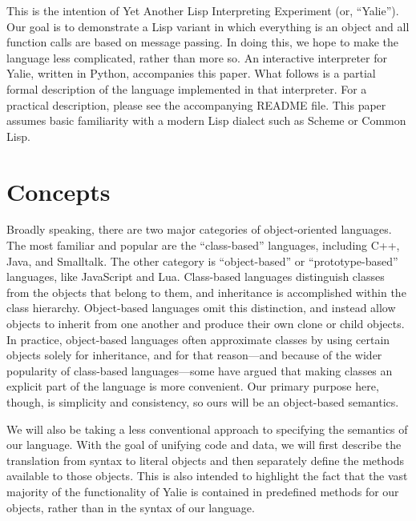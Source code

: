 \documentclass[twocolumn]{article}
\begin{document}
This is the intention of Yet Another Lisp Interpreting Experiment (or,
``Yalie''). Our goal is to demonstrate a Lisp variant in which
everything is an object and all function calls are based on message
passing. In doing this, we hope to make the language less complicated,
rather than more so. An interactive interpreter for Yalie, written in
Python, accompanies this paper. What follows is a partial formal
description of the language implemented in that interpreter.  For a
practical description, please see the accompanying README file. This
paper assumes basic familiarity with a modern Lisp dialect such as
Scheme or Common Lisp.

\section*{Concepts}
Broadly speaking, there are two major categories of object-oriented
languages.\cite{Abadi} The most familiar and popular are the
``class-based'' languages, including C++, Java, and Smalltalk. The
other category is ``object-based'' or ``prototype-based'' languages,
like JavaScript and Lua. Class-based languages distinguish classes
from the objects that belong to them, and inheritance is accomplished
within the class hierarchy. Object-based languages omit this
distinction, and instead allow objects to inherit from one another and
produce their own clone or child objects. In practice, object-based
languages often approximate classes by using certain objects solely
for inheritance, and for that reason---and because of the wider
popularity of class-based languages---some have argued that making
classes an explicit part of the language is more
convenient.\cite{Bruce} Our primary purpose here, though, is
simplicity and consistency, so ours will be an object-based semantics.

We will also be taking a less conventional approach to specifying the
semantics of our language. With the goal of unifying code and data, we
will first describe the translation from syntax to literal objects and
then separately define the methods available to those objects. This is
also intended to highlight the fact that the vast majority of the
functionality of Yalie is contained in predefined methods for our
objects, rather than in the syntax of our language.
\end{document}

